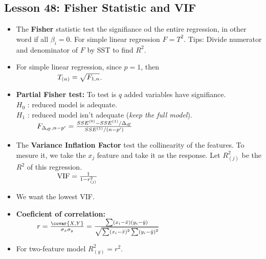 \documentclass[10pt, french]{article}
\begin{document}
\begin{multicols*}{3}
\section*{Lesson 48: Fisher Statistic and VIF}
\begin{itemize}[align=left,leftmargin=*]
  \item The \textbf{Fisher} statistic test the signifiance od the entire regression, in other word if all $\beta_i = 0$. For simple linear regression $F = T^2$.
  Tips: Divide numerator and denominator of $F$ by SST to find $R^2$.
  \item For simple linear regression, since $p=1$, then \\
  $\hspace*{2cm} T_{(n)} = \sqrt{F_{1,n}}$.
  \item \textbf{Partial Fisher test:} To test is $q$ added variables have signifiance. \\ $H_0$ : reduced model is adequate. \\ $H_1$ : reduced model isn't adequate (\emph{keep the full model}). \\
  $\hspace*{1cm} F_{\Delta_{df},n-p'} = \frac{SSE^{(0)} - SSE^{(1)}/\Delta_{df}}{SSE^{(1)}/(n-p')}$
  \item The \textbf{Variance Inflation Factor} test the collinearity of the features. To mesure it, we take the $x_j$ feature and take it as the response. Let $R_{(j)}^2$ be the $R^2$ of this regression. \\
  $\hspace*{2cm} \textrm{VIF} = \frac{1}{1 - r_{(j)}^2}$
  \item[] We want the lowest VIF.
  \item \textbf{Coeficient of correlation:} \\
  $\hspace*{1cm} r = \frac{\covar{X,Y}}{\sigma_x \sigma_y} = \frac{\sum (x_i-\bar{x})(y_i - \bar{y}) }{\sqrt{\sum (x_i-\bar{x})^2 \sum (y_i - \bar{y})^2}}$
  \item For two-feature model $R_{(y)}^2 = r^2$.

\end{itemize}


\end{multicols*}
\end{document}
